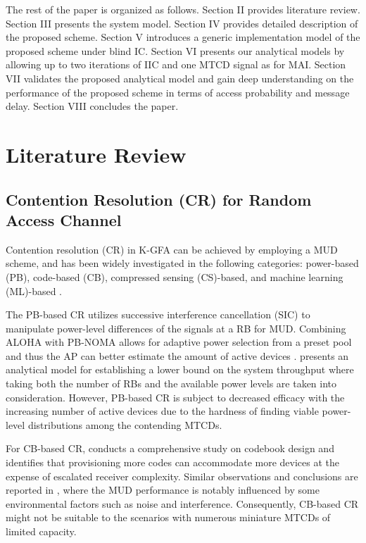 \documentclass[a4paper]{IEEEtran}
\begin{document}
The rest of the paper is organized as follows. Section II provides literature review. Section III presents the system model. Section IV provides detailed description of the proposed scheme. Section V introduces a generic implementation model of the proposed scheme under blind IC. Section VI presents our analytical models by allowing up to two iterations of IIC and one MTCD signal as for MAI. Section VII validates the proposed analytical model and gain deep understanding on the performance of the proposed scheme in terms of access probability and message delay. Section VIII concludes the paper.

\section{Literature Review}

\subsection{Contention Resolution (CR) for Random Access Channel}

Contention resolution (CR) in K-GFA can be achieved by employing a MUD scheme, and has been widely investigated in the following categories: power-based (PB), code-based (CB), compressed sensing (CS)-based, and machine learning (ML)-based \cite{grant_free_NOMA_survey}. 

The PB-based CR utilizes successive interference cancellation (SIC) to manipulate power-level differences of the signals at a RB for MUD. Combining ALOHA with PB-NOMA allows for adaptive power selection from a preset pool and thus the AP can better estimate the amount of active devices \cite{pd-mud2}. \cite{pd-mud3} presents an analytical model for establishing a lower bound on the system throughput where taking both the number of RBs and the available power levels are taken into consideration. However, PB-based CR is subject to decreased efficacy with the increasing number of active devices due to the hardness of finding viable power-level distributions among the contending MTCDs.

For CB-based CR, \cite{cd-based3} conducts a comprehensive study on codebook design and identifies that provisioning more codes can accommodate more devices at the expense of escalated receiver complexity. Similar observations and conclusions are reported in \cite{cd-based4}, where the MUD performance is notably influenced by some environmental factors such as noise and interference. Consequently, CB-based CR might not be suitable to the scenarios with numerous miniature MTCDs of limited capacity.
\end{document}
